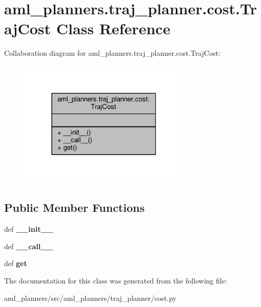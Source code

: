 \hypertarget{classaml__planners_1_1traj__planner_1_1cost_1_1_traj_cost}{\section{aml\-\_\-planners.\-traj\-\_\-planner.\-cost.\-Traj\-Cost Class Reference}
\label{classaml__planners_1_1traj__planner_1_1cost_1_1_traj_cost}
}


Collaboration diagram for aml\-\_\-planners.\-traj\-\_\-planner.\-cost.\-Traj\-Cost\-:\nopagebreak
\begin{figure}[H]
\begin{center}
\leavevmode
\includegraphics[width=232pt]{classaml__planners_1_1traj__planner_1_1cost_1_1_traj_cost__coll__graph}
\end{center}
\end{figure}
\subsection*{Public Member Functions}
\begin{DoxyCompactItemize}
\item 
\hypertarget{classaml__planners_1_1traj__planner_1_1cost_1_1_traj_cost_ae429e38d01136b2033c19e2f25de4c95}{def {\bfseries \-\_\-\-\_\-init\-\_\-\-\_\-}}\label{classaml__planners_1_1traj__planner_1_1cost_1_1_traj_cost_ae429e38d01136b2033c19e2f25de4c95}

\item 
\hypertarget{classaml__planners_1_1traj__planner_1_1cost_1_1_traj_cost_a8faf444cd4e34aa186cad921cf50eeec}{def {\bfseries \-\_\-\-\_\-call\-\_\-\-\_\-}}\label{classaml__planners_1_1traj__planner_1_1cost_1_1_traj_cost_a8faf444cd4e34aa186cad921cf50eeec}

\item 
\hypertarget{classaml__planners_1_1traj__planner_1_1cost_1_1_traj_cost_ab68f7dabc15db0808735255bd5fe276f}{def {\bfseries get}}\label{classaml__planners_1_1traj__planner_1_1cost_1_1_traj_cost_ab68f7dabc15db0808735255bd5fe276f}

\end{DoxyCompactItemize}


The documentation for this class was generated from the following file\-:\begin{DoxyCompactItemize}
\item 
aml\-\_\-planners/src/aml\-\_\-planners/traj\-\_\-planner/cost.\-py\end{DoxyCompactItemize}
